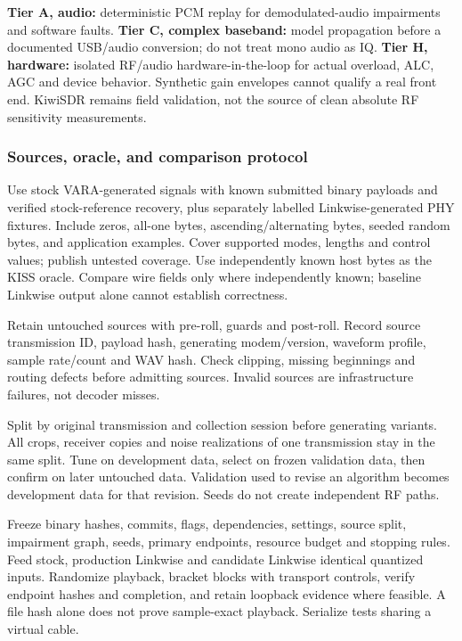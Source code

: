 \documentclass[11pt,a4paper]{article}
\begin{document}
\textbf{Tier A, audio:} deterministic PCM replay for demodulated-audio impairments and software faults. \textbf{Tier C, complex baseband:} model propagation before a documented USB/audio conversion; do not treat mono audio as IQ. \textbf{Tier H, hardware:} isolated RF/audio hardware-in-the-loop for actual overload, ALC, AGC and device behavior. Synthetic gain envelopes cannot qualify a real front end. KiwiSDR remains field validation, not the source of clean absolute RF sensitivity measurements.

\subsubsection{Sources, oracle, and comparison protocol}
Use stock VARA-generated signals with known submitted binary payloads and verified stock-reference recovery, plus separately labelled Linkwise-generated PHY fixtures. Include zeros, all-one bytes, ascending/alternating bytes, seeded random bytes, and application examples. Cover supported modes, lengths and control values; publish untested coverage. Use independently known host bytes as the KISS oracle. Compare wire fields only where independently known; baseline Linkwise output alone cannot establish correctness.

Retain untouched sources with pre-roll, guards and post-roll. Record source transmission ID, payload hash, generating modem/version, waveform profile, sample rate/count and WAV hash. Check clipping, missing beginnings and routing defects before admitting sources. Invalid sources are infrastructure failures, not decoder misses.

Split by original transmission and collection session before generating variants. All crops, receiver copies and noise realizations of one transmission stay in the same split. Tune on development data, select on frozen validation data, then confirm on later untouched data. Validation used to revise an algorithm becomes development data for that revision. Seeds do not create independent RF paths.

Freeze binary hashes, commits, flags, dependencies, settings, source split, impairment graph, seeds, primary endpoints, resource budget and stopping rules. Feed stock, production Linkwise and candidate Linkwise identical quantized inputs. Randomize playback, bracket blocks with transport controls, verify endpoint hashes and completion, and retain loopback evidence where feasible. A file hash alone does not prove sample-exact playback. Serialize tests sharing a virtual cable.
\end{document}
